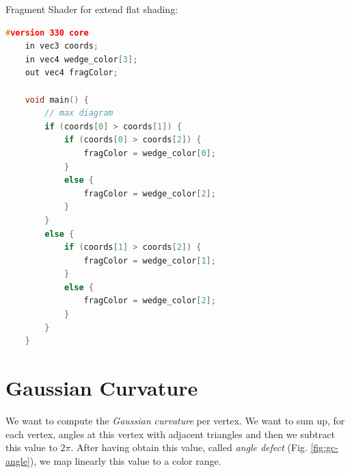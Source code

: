 Fragment Shader for extend flat shading:
\begin{lstlisting}[language=C++,
    directivestyle={\color{black}}
    emph={int,char,double,float,unsigned},
    emphstyle={\color{blue}}
   ]
    #version 330 core
    in vec3 coords;
    in vec4 wedge_color[3];
    out vec4 fragColor;

    void main() {
        // max diagram
        if (coords[0] > coords[1]) {
            if (coords[0] > coords[2]) {
                fragColor = wedge_color[0];
            }
            else {
                fragColor = wedge_color[2];
            }
        }
        else {
            if (coords[1] > coords[2]) {
                fragColor = wedge_color[1];
            }
            else {
                fragColor = wedge_color[2];
            }
        }
    }
\end{lstlisting}

\section{Gaussian Curvature}
We want to compute the \textit{Gaussian curvature} per vertex. We want to sum up, for each vertex, angles at this vertex with adjacent triangles and then we subtract this value to $2\pi$.
After having obtain this value, called \textit{angle defect} (Fig. \ref{fig:gc-angle}), we map linearly this value to a color range.

